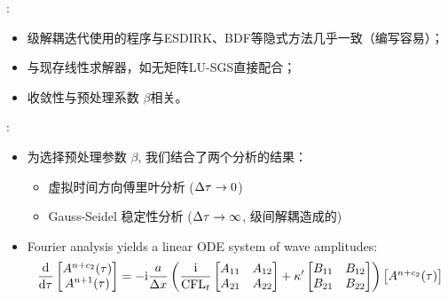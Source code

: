 \documentclass[aspectratio=169,serif]{beamer} %
\begin{document}
\begin{frame}{\secname: \subsecname}
  \begin{itemize}
    \item 级解耦迭代使用的程序与ESDIRK、BDF等隐式方法几乎一致（编写容易）；
    \item 与现存线性求解器，如无矩阵LU-SGS直接配合；
    \item 收敛性与预处理系数 $\beta$相关。
  \end{itemize}
\end{frame}

\begin{frame}{\secname: \subsecname}
  \small
  \begin{itemize}
    \item 为选择预处理参数 $\beta$, 我们结合了两个分析的结果：
          \begin{itemize}
            \item 虚拟时间方向傅里叶分析 (${\Delta}\tau \rightarrow 0$)
          \end{itemize}
          \begin{itemize}
            \item Gauss-Seidel 稳定性分析 (${\Delta}\tau \rightarrow \infty$, 级间解耦造成的)
          \end{itemize}
    \item Fourier analysis yields a linear ODE system of wave amplitudes:
          \footnotesize
          \begin{equation}
            \derivative{ }{\tau}
            \begin{bmatrix}
              A^{n+c_2}(\tau) \\
              A^{n+1}(\tau)
            \end{bmatrix}
            =
            -\imagUnit \frac{a}{\inc x}
            \left(\frac{\imagUnit}{\CFLt}\begin{bmatrix}
              A_{11} & A_{12} \\
              A_{21} & A_{22} \\
            \end{bmatrix}
            +\kappa'
            \begin{bmatrix}
              B_{11} & B_{12} \\
              B_{21} & B_{22} \\
            \end{bmatrix}
            \right)
            \begin{bmatrix}
              A^{n+c_2}(\tau) \\

\end{bmatrix}
\end{equation}
\end{itemize}
\end{frame}
\end{document}
